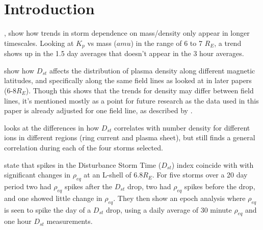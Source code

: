 \documentclass[10pt,twocolumn]{article}
\begin{document}
\section{Introduction}

\cite{Takahashi2006}, show how trends in storm dependence on mass/density only appear in longer timescales. Looking at $K_p$ vs mass ($amu$) in the range of 6 to 7 $R_E$, a trend shows up in the 1.5 day averages that doesn't appear in the 3 hour averages.

\cite{Denton2006} show how $D_{st}$ affects the distribution of plasma density along different magnetic latitudes, and specifically along the same field lines as looked at in later papers (6-8$R_E$). Though this shows that the trends for density may differ between field lines, it's mentioned mostly as a point for future research as the data used in this paper is already adjusted for one field line, as described by \cite{Takahashi2010}.

\cite{Yao2008} looks at the differences in how $D_{st}$ correlates with number density for different ions in different regions (ring current and plasma sheet), but still finds a general correlation during each of the four storms selected.

\cite{Takahashi2010} state that spikes in the Disturbance Storm Time ($D_{st}$) index coincide with with significant changes in $\rho_{eq}$ at an L-shell of 6.8$R_E$. For five storms over a 20 day period two had $\rho_{eq}$ spikes after the $D_{st}$ drop, two had $\rho_{eq}$ spikes before the drop, and one showed little change in $\rho_{eq}$. They then show an epoch analysis where $\rho_{eq}$ is seen to spike the day of a $D_{st}$ drop, using a daily average of 30 minute $\rho_{eq}$ and one hour $D_{st}$ measurements. 


\end{document}

